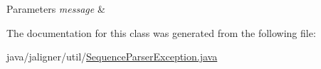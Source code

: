 \begin{DoxyParams}{Parameters}
{\em message} & \\
\hline
\end{DoxyParams}


The documentation for this class was generated from the following file\+:\begin{DoxyCompactItemize}
\item 
java/jaligner/util/\hyperlink{_sequence_parser_exception_8java}{Sequence\+Parser\+Exception.\+java}\end{DoxyCompactItemize}
